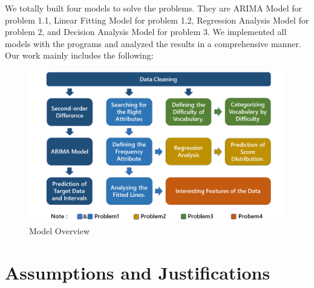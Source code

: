 \documentclass[12pt]{article}
\begin{document}
We totally built four models to solve the problems. They are ARIMA Model for problem 1.1, Linear Fitting Model for problem 1.2, Regression Analysis Model for problem 2, and Decision Analysis Model for problem 3. 
We implemented all models with the programs and analyzed the results in a comprehensive manner.
Our work mainly includes the following:
\begin{figure}[H]
    \centering
    \includegraphics[scale=0.6]{overview.png}
    \caption{Model Overview}
\end{figure}







\section{Assumptions and Justifications}
\end{document}
